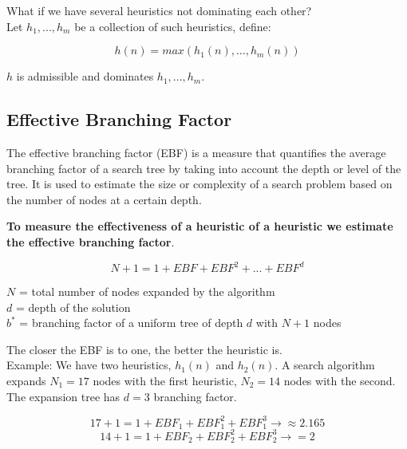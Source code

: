 \documentclass{article}
\begin{document}
What if we have several heuristics not dominating each other? \\

Let $h_1, ..., h_m$ be a collection of such heuristics, define:

\begin{equation}
    h(n) = max (h_1(n), ..., h_m(n))
\end{equation}

$h$ is admissible and dominates $h_1, ..., h_m$.

\newpage

\subsection{Effective Branching Factor}

The effective branching factor (EBF) is a measure that quantifies the average branching factor of a search tree by taking into account the depth or level of the tree. It is used to estimate the size or complexity of a search problem based on the number of nodes at a certain depth. \\

\begin{center}
    \textbf{To measure the effectiveness of a heuristic of a heuristic we estimate the effective branching factor}.
\end{center}

\begin{equation}
    N + 1 = 1 + EBF + EBF^2 + ... + EBF^d    
\end{equation}
\begin{flushleft}
$N$ = total number of nodes expanded by the algorithm \\
$d$ = depth of the solution \\
$b^*$ = branching factor of a uniform tree of depth $d$ with $N + 1$ nodes
\end{flushleft}

The closer the EBF is to one, the better the heuristic is. \\

Example:
We have two heuristics, $h_1(n)$ and $h_2(n)$. A search algorithm expands $N_1 = 17$ nodes with the first heuristic, $N_2 = 14$ nodes with the second. The expansion tree has $d = 3$ branching factor.

\begin{equation}
    17 + 1 = 1 + EBF_1 + EBF_1^2 + EBF_1^3 \rightarrow \approx 2.165
\end{equation}
\begin{equation}
    14 + 1 = 1 + EBF_2 + EBF_2^2 + EBF_2^3 \rightarrow = 2
\end{equation}
\end{document}
